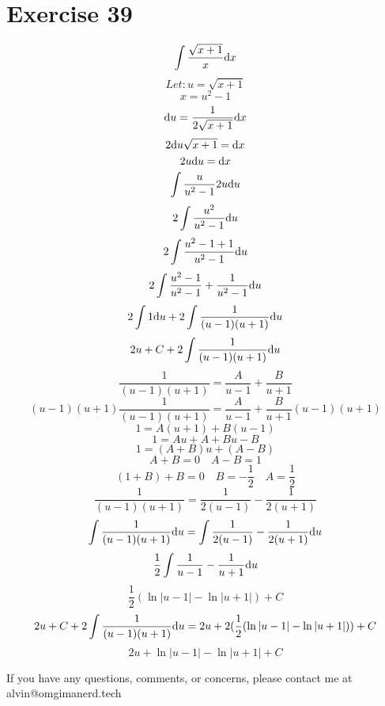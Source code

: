 \documentclass{math}
\begin{document}
\section*{Exercise 39}
\[ \int{\frac{\sqrt{x+1}}{x}\mathrm{d}{x}} \]
\[ Let: u = \sqrt{x+1} \]
\[ x = u^{2}-1 \]
\[ \mathrm{d}{u} = \frac{1}{2\sqrt{x+1}}\mathrm{d}{x} \]
\[ 2\mathrm{d}{u}\sqrt{x+1} = \mathrm{d}{x} \]
\[ 2u\mathrm{d}{u} = \mathrm{d}{x} \]
\[ \int{\frac{u}{u^{2}-1}2u\mathrm{d}{u}} \]
\[ 2\int{\frac{u^{2}}{u^{2}-1}\mathrm{d}{u}} \]
\[ 2\int{\frac{u^{2}-1+1}{u^{2}-1}\mathrm{d}{u}} \]
\[ 2\int{\frac{u^{2}-1}{u^{2}-1}+\frac{1}{u^{2}-1}\mathrm{d}{u}} \]
\[ 2\int{1\mathrm{d}{u}}+2\int{\frac{1}{(u-1)(u+1)}\mathrm{d}{u}} \]
\[ 2u+C+2\int{\frac{1}{(u-1)(u+1)}\mathrm{d}{u}} \]
\[ \frac{1}{(u-1)(u+1)} = \frac{A}{u-1}+\frac{B}{u+1} \]
\[ (u-1)(u+1)\frac{1}{(u-1)(u+1)} = \frac{A}{u-1}+\frac{B}{u+1}(u-1)(u+1) \]
\[ 1 = A(u+1)+B(u-1) \]
\[ 1 = Au+A+Bu-B \]
\[ 1 = (A+B)u+(A-B) \]
\[ A+B = 0 \quad A-B = 1 \]
\[ (1+B)+B = 0 \quad B = -\frac{1}{2} \quad A = \frac{1}{2} \]
\[ \frac{1}{(u-1)(u+1)} = \frac{1}{2(u-1)}-\frac{1}{2(u+1)} \]
\[ \int{\frac{1}{(u-1)(u+1)}\mathrm{d}{u}} =
   \int{\frac{1}{2(u-1)}-\frac{1}{2(u+1)}\mathrm{d}{u}} \]
\[ \frac{1}{2}\int{\frac{1}{u-1}-\frac{1}{u+1}\mathrm{d}{u}} \]
\[ \frac{1}{2}(\ln|u-1|-\ln|u+1|)+C \]
\[ 2u+C+2\int{\frac{1}{(u-1)(u+1)}\mathrm{d}{u}} =
   2u+2(\frac{1}{2}(\ln|u-1|-\ln|u+1|))+C \]
\[ 2u+\ln|u-1|-\ln|u+1|+C \]

\begin{center}
  If you have any questions, comments, or concerns, please contact me at
  alvin@omgimanerd.tech
\end{center}
\end{document}
